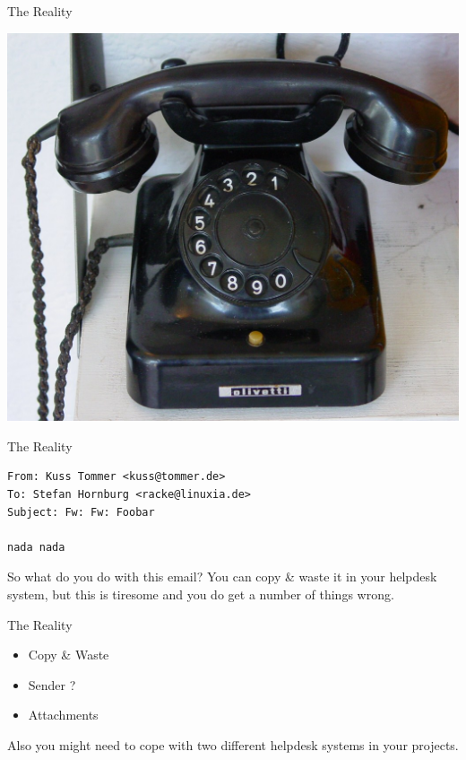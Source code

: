 \begin{frame}[plain]{The Reality}
\begin{center}
  \includegraphics[width=\textwidth,height=1\textheight,keepaspectratio]{pics/phone.jpg}
\end{center}
\end{frame}

\begin{frame}[fragile]{The Reality}
\begin{lstlisting}
From: Kuss Tommer <kuss@tommer.de>
To: Stefan Hornburg <racke@linuxia.de>
Subject: Fw: Fw: Foobar

nada nada
\end{lstlisting}
\end{frame}

So what do you do with this email? You can copy \& waste it in your
helpdesk system, but this is tiresome and you do get a number of
things wrong.

\begin{frame}{The Reality}
\begin{itemize}
\item Copy \& Waste
\item Sender ?
\item Attachments
\end{itemize}
\end{frame}

Also you might need to cope with two different helpdesk systems
in your projects.

